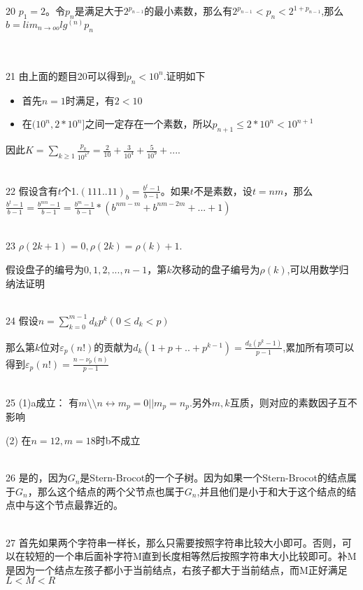 \documentclass[onecolumn]{article}
\begin{document}
~\\
~\\
20 $p_{1}=2$。令$p_{n}$是满足大于$2^{p_{n-1}}$的最小素数，那么有$2^{p_{n-1}}<p_{n}<2^{1+p_{n-1}}$,那么$b=lim_{n\rightarrow oo}lg^{(n)}p_{n}$ \par
~\\
~\\
21 由上面的题目20可以得到$p_{n}<10^{n}$.证明如下\par
\begin{itemize}
	\item 首先$n=1$时满足，有$2<10$
	\item 在$(10^{n},2*10^{n}]$之间一定存在一个素数，所以$p_{n+1}\leq 2*10^{n}<10^{n+1}$
\end{itemize}
因此$K=\sum_{k\ge 1}\frac{p_{k}}{10^{k^{2}}}=\frac{2}{10}+\frac{3}{10^{4}}+\frac{5}{10^9}+...$. \par
~\\
22 假设含有$t$个1.$(111..11)_{b} = \frac{b^{t}-1}{b-1}$。如果$t$不是素数，设$t=nm$，那么$\frac{b^{t}-1}{b-1}=\frac{b^{mn}-1}{b-1}=\frac{b^{m}-1}{b-1}*(b^{nm-m}+b^{nm-2m}+...+1)$ \par
~\\
23 $\rho (2k+1)=0,\rho(2k)=\rho(k)+1$. \par
假设盘子的编号为$0,1,2,...,n-1$，第$k$次移动的盘子编号为$\rho(k)$,可以用数学归纳法证明\par
~\\
24 假设$n=\sum_{k=0}^{m-1}d_{k}p^{k}(0\le d_{k}<p)$\par
那么第$k$位对$\varepsilon _{p}(n!)$的贡献为$d_{k}(1+p+..+p^{k-1})=\frac{d_{k}(p^{k}-1)}{p-1}$,累加所有项可以得到$\varepsilon _{p}(n!)=\frac{n-\nu _{p}(n)}{p-1}$ \par
~\\
25 (1)a成立： 有$m\setminus \setminus n\leftrightarrow m_{p}=0 || m_{p}=n_{p}$.另外$m,k$互质，则对应的素数因子互不影响\par
(2) 在$n=12,m=18$时b不成立 \par
~\\
26 是的，因为$G_{n}$是Stern-Brocot的一个子树。因为如果一个Stern-Brocot的结点属于$G_{n}$，那么这个结点的两个父节点也属于$G_{n}$,并且他们是小于和大于这个结点的结点中与这个节点最靠近的。\par
~\\
27 首先如果两个字符串一样长，那么只需要按照字符串比较大小即可。否则，可以在较短的一个串后面补字符M直到长度相等然后按照字符串大小比较即可。补M是因为一个结点左孩子都小于当前结点，右孩子都大于当前结点，而M正好满足$L<M<R$ \par
\end{document}
